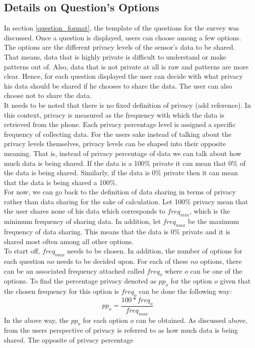 \subsection{Details on Question's Options}
In section \ref{question_format}, the template of the questions for the survey was discussed. Once a question is displayed, users can choose among a few options.
The options are the different privacy levels of the sensor's data to be shared. That means, data that is highly private is difficult to understand or make patterns out of. Also, data that is not private at all is raw and 
patterns are more clear. Hence, for each question displayed the user can decide with what privacy his data should be shared if he chooses to share the data. The user can
also choose not to share the data.\\
It needs to be noted that there is no fixed definition of privacy (add reference). In this context, privacy is measured as the frequency with which the data is retrieved from the phone.
Each privacy percentage level is assigned a specific frequency of collecting data. For the users sake instead of talking about the privacy levels themselves, privacy levels
can be shaped into their opposite meaning. That is, instead of privacy percentage of data we can talk about how much data is being shared. If the data is a 100\% private it can mean that 0\% of the data is being shared.
Similarly, if the data is 0\% private then it can mean that the data is being shared a 100\%.\\
For now, we can go back to the definition of data sharing in terms of privacy rather than data sharing for the sake of calculation.
Let 100\% privacy mean that the user shares none of his data which corresponds to $freq_{min}$, which is the minimum frequency of sharing data. In addition, let $freq_{max}$ be the maximum frequency
of data sharing. This means that the data is 0\% private and it is shared most often among all other options.\\ To start off, $freq_{max}$ needs to be chosen. In addition, the number of options for each question $no$ needs to be decided upon.
For each of these $no$ options, there can be an associated frequency attached called $freq_{o}$ where $o$ can be one of the options. To find the percentage privacy denoted as $pp_o$ for the option $o$ given that the chosen
frequency for this option is $freq_{o}$ can be done the following way:
$$pp_o = \frac{100*freq_o}{freq_{max}}$$
In the above way, the $pp_o$ for each option $o$ can be obtained. As discussed above, from the users perspective of privacy is referred to as how much data is being shared. The opposite of privacy percentage
